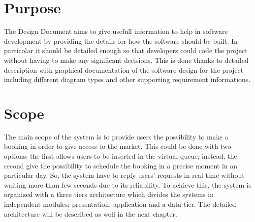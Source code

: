 \section{Purpose}
The Design Document aims to give usefull information to help in software development by providing the details for how the software should be built. In particolar it should be detailed enough so that developers could code the project without having to make any significant decisions. This is done thanks to detailed description with graphical documentation of the software design for the project including different diagram types and other supporting requirement informations.
\section{Scope}
The main scope of the system is to provide users the possibility to make a booking in order to give access to the market. This could be done with two options: the first allows users to be inserted in the virtual queue; instead, the second give the possibility to schedule the booking in a precise moment in an particular day. 
So, the system have to reply users' requests in real time without waiting more than few seconds due to its reliability. 
To achieve this, the system is organized with a three tiers architecture which divides the systems in independent modules: presentation, application and a data tier. The detailed architecture will be described as well in the next chapter.

\begin{comment}
in which a presentation layer runs on a client, and a data and application layers get stored on a server. [TODO]
The client side in particolar is composed by two different applications with the same functionalites:
\begin{itemize}
\item \textbf{CLup}: It's the application used by users who have a smartphone. They can manage their booking by themselves;
\item \textbf{CLup Operator}: It's the application used by receptionists who act as an intermediary to manage booking of users that have only a mobilephone.
\end{itemize}

Instead the server side contains:

\begin{itemize}
\item \textbf{Application layer}: it accounts for managing the users' entrances and for a proper operation of the system;
\item \textbf{Data layer}: it stores information and personal data of each users;
\end{itemize}

\end{comment}

